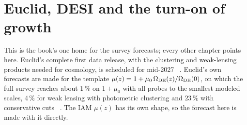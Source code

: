 \section{Euclid, DESI and the turn-on of growth}\label{sec:sp_euclid}
This is the book's one home for the survey forecasts; every other chapter points here. Euclid's complete first data release, with the
clustering and weak-lensing products needed for cosmology, is scheduled for mid-2027~\cite{ESA2026DR1} \observed. Euclid's own forecasts are made
for the template $\mu(z)=1+\mu_0\,\Omega_{\rm DE}(z)/\Omega_{\rm DE}(0)$, on which the full survey reaches about $1\,\%$ on $1+\mu_0$ with all
probes to the smallest modeled scales, $4\,\%$ for weak lensing with photometric clustering and $23\,\%$ with conservative cuts~\cite{Albuquerque2025,Frusciante2025} \observed. The IAM
$\mu(z)$ has its own shape, so the forecast here is made with it directly.

